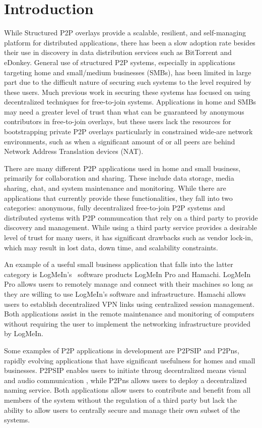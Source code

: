\documentclass[conference]{IEEEtran}
\begin{document}
\section{Introduction}
While Structured P2P overlays provide a scalable, resilient, and self-managing
platform for distributed applications, there has been a slow adoption rate
besides their use in discovery in data distribution services such as BitTorrent
and eDonkey.  General use of structured P2P systems, especially in applications
targeting home and small/medium businesses (SMBs), has been limited in large
part due to the difficult nature of securing such systems to the level required
by these users.  Much previous work in securing these systems has focused on
using decentralized techniques for free-to-join systems.  Applications in home
and SMBs may need a greater level of trust than what can be guaranteed by
anonymous contributors in free-to-join overlays, but these users lack the
resources for bootstrapping private P2P overlays particularly in constrained
wide-are network environments, such as when a significant amount of or all
peers are behind Network Address Translation devices (NAT).

There are many different P2P applications used in home and small business,
primarily for collaboration and sharing.  These include data storage, media
sharing, chat, and system maintenance and monitoring.  While there are
applications that currently provide these functionalities, they fall into two
categories:  anonymous, fully decentralized free-to-join P2P systems and
distributed systems with P2P communcation that rely on a third party to provide
discovery and management.  While using a third party service provides a desirable
level of trust for many users, it has significant drawbacks such as vendor lock-in,
which may result in lost data, down time, and scalability constraints.

An example of a useful small business application that falls into the latter
category is LogMeIn's~\cite{logmein} software products LogMeIn Pro and Hamachi.
LogMeIn Pro allows users to remotely manage and connect with their machines so
long as they are willing to use LogMeIn's software and infrastructure.  Hamachi
allows users to establish decentralized VPN links using centralized session
management.  Both applications assist in the remote maintenance and monitoring
of computers without requiring the user to implement the networking
infrastructure provided by LogMeIn.

Some examples of P2P applications in development are P2PSIP and P2Pns, rapidly
evolving applications that have significant usefulness for homes and small
businesses.  P2PSIP enables users to initiate throug decentralized means visual
and audio communication , while P2Pns allows users to deploy a decentralized
naming service.  Both applications allow users to contribute and benefit from
all members of the system without the regulation of a third party but lack the
ability to allow users to centrally secure and manage their own subset of the
systems.
\end{document}
